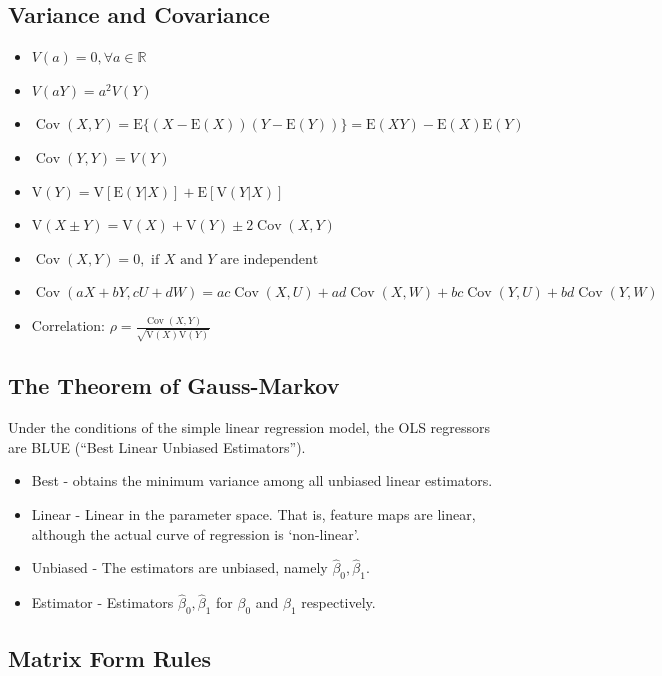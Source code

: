 \documentclass[11pt]{article}
\newcommand{\real}{\mathbb{R}}
\begin{document}
\subsection{Variance and Covariance}
\begin{itemize}
    \item $V(a) = 0, \forall a \in \real$
    \item $V(aY) = a^2V(Y)$
    \item $\operatorname{Cov}(X, Y)= \mathrm{E}\{(X-\mathrm{E}(X))(Y-\mathrm{E}(Y))\}=\mathrm{E}(X Y)-\mathrm{E}(X) \mathrm{E}(Y)$
    \item $\operatorname{Cov}(Y, Y)=V(Y)$
    \item $\mathrm{V}(Y)=\mathrm{V}[\mathrm{E}(Y | X)]+\mathrm{E}[\mathrm{V}(Y | X)]$
    \item $\mathrm{V}(X \pm Y)=\mathrm{V}(X)+\mathrm{V}(Y) \pm 2 \operatorname{Cov}(X, Y)$
    \item $\operatorname{Cov}(X, Y)=0, \text { if } X \text { and } Y \text { are independent }$
    \item $\operatorname{Cov}(a X+b Y, c U+d W)=a c \operatorname{Cov}(X, U)+a d \operatorname{Cov}(X, W)+b c \operatorname{Cov}(Y, U)+b d \operatorname{Cov}(Y, W)$
    \item $\text {Correlation: } \rho=\frac{\operatorname{Cov}(X, Y)}{\sqrt{\mathrm{V}(X) \mathrm{V}(Y)}}$
\end{itemize}

\subsection{The Theorem of Gauss-Markov}
Under the conditions of the simple linear regression model, the OLS regressors are BLUE (``Best Linear Unbiased Estimators'').
\begin{itemize}
    \item Best - obtains the minimum variance among all unbiased linear estimators. 
    \item Linear - Linear in the parameter space. That is, feature maps are linear, although the actual curve of regression is `non-linear'.
    \item Unbiased - The estimators are unbiased, namely $\hat{\beta}_0, \hat{\beta}_1$.
    \item Estimator - Estimators $\hat{\beta}_0, \hat{\beta}_1$ for $\beta_0$ and $\beta_1$ respectively.
\end{itemize}

\subsection{Matrix Form Rules}
\end{document}
